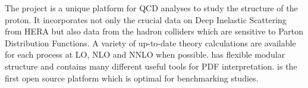 
The \fitter project is a unique platform for QCD analyses to study the 
structure of the proton. It incorporates not only the crucial data on
Deep Inelastic Scattering from HERA but also data from the hadron colliders 
which are sensitive to Parton Distribution Functions. A variety of up-to-date 
theory calculations are available for each process at LO, NLO and NNLO 
when possible.  
\fitter has flexible modular structure and contains many different useful tools for PDF interpretation. 
\fitter is the first open source platform which is optimal for benchmarking studies.

